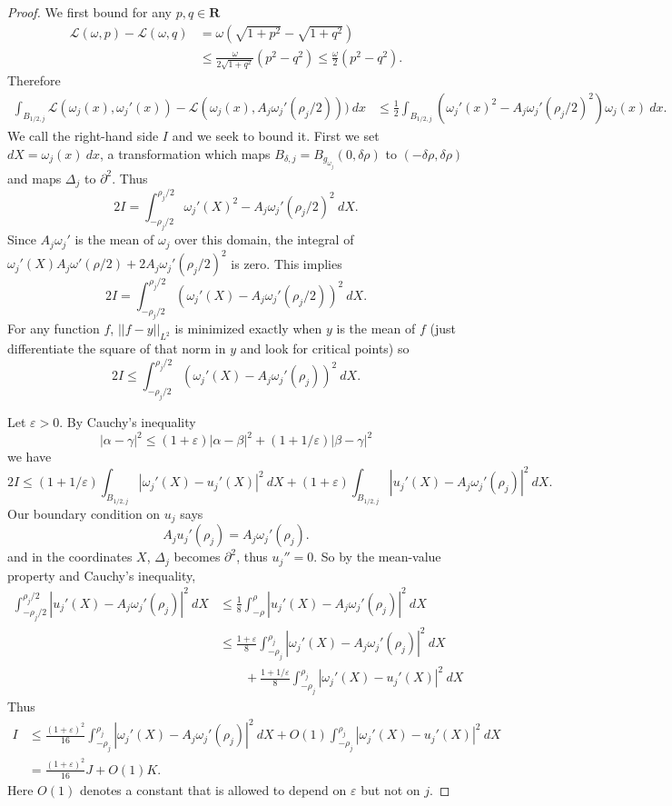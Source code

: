 \documentclass[reqno,12pt,letterpaper]{amsart}
\newcommand{\RR}{\mathbf{R}}
\theoremstyle{definition}
\numberwithin{equation}{section}
\begin{document}
\begin{proof}
We first bound for any $p, q \in \RR$
\begin{align*}
\mathscr L(\omega, p) - \mathscr L(\omega, q) &= \omega(\sqrt{1 + p^2} - \sqrt{1 + q^2}) \\
&\leq \frac{\omega}{2\sqrt{1 + q^2}}(p^2 - q^2) \leq \frac{\omega}{2}(p^2 - q^2).
\end{align*}
Therefore
\begin{align*}
\int_{B_{1/2,j}} \mathscr L(\omega_j(x), \omega_j'(x)) - \mathscr L(\omega_j(x),  A_j \omega_j'(\rho_j/2))) ~dx &\leq \frac{1}{2} \int_{B_{1/2,j}} (\omega_j'(x)^2 -  A_j \omega_j'(\rho_j/2)^2 ) \omega_j(x) ~dx.
\end{align*}
We call the right-hand side $I$ and we seek to bound it.
First we set $dX = \omega_j(x) ~dx$, a transformation which maps $B_{\delta,j} = B_{g_{\omega_j}}(0, \delta\rho)$ to $(-\delta\rho, \delta\rho)$ and maps $\Delta_j$ to $\partial^2$.
Thus
$$2I = \int_{-\rho_j/2}^{\rho_j/2} \omega_j'(X)^2 -  A_j \omega_j'(\rho_j/2)^2 ~dX.$$
Since $A_j \omega_j'$ is the mean of $\omega_j$ over this domain, the integral of $\omega_j'(X) A_j\omega'(\rho/2) + 2 A_j \omega_j'(\rho_j/2)^2$ is zero.
This implies
$$2I = \int_{-\rho_j/2}^{\rho_j/2} (\omega_j'(X) -  A_j \omega_j'(\rho_j/2))^2 ~dX.$$
For any function $f$, $||f - y||_{L^2}$ is minimized exactly when $y$ is the mean of $f$ (just differentiate the square of that norm in $y$ and look for critical points) so
$$2I \leq \int_{-\rho_j/2}^{\rho_j/2} (\omega_j'(X) -  A_j \omega_j'(\rho_j))^2 ~dX.$$

Let $\varepsilon > 0$.
By Cauchy's inequality
$$|\alpha - \gamma|^2 \leq (1 + \varepsilon) |\alpha - \beta|^2 + (1 + 1/\varepsilon) |\beta - \gamma|^2$$
we have
$$2I \leq (1 + 1/\varepsilon) \int_{B_{1/2,j}} |\omega_j'(X) - u_j'(X)|^2 ~dX + (1 + \varepsilon) \int_{B_{1/2,j}} |u_j'(X) -  A_j \omega_j'(\rho_j)|^2 ~dX.$$
Our boundary condition on $u_j$ says
$$A_j u_j'(\rho_j) = A_j\omega_j'(\rho_j).$$
and in the coordinates $X$, $\Delta_j$ becomes $\partial^2$, thus $u_j'' = 0$.
So by the mean-value property and Cauchy's inequality,
\begin{align*}
\int_{-\rho_j/2}^{\rho_j/2} |u_j'(X) -  A_j \omega_j'(\rho_j)|^2 ~dX &\leq \frac{1}{8} \int_{-\rho}^{\rho} |u_j'(X) -  A_j \omega_j'(\rho_j)|^2 ~dX\\
&\leq \frac{1 + \varepsilon}{8} \int_{-\rho_j}^{\rho_j} |\omega_j'(X) -  A_j \omega_j'(\rho_j)|^2 ~dX \\
&\qquad + \frac{1 + 1/\varepsilon}{8} \int_{-\rho_j}^{\rho_j} |\omega_j'(X) - u_j'(X)|^2 ~dX
\end{align*}
Thus
\begin{align*}
I &\leq \frac{(1 + \varepsilon)^2}{16} \int_{-\rho_j}^{\rho_j} |\omega_j'(X) -  A_j \omega_j'(\rho_j)|^2 ~dX + O(1) \int_{-\rho_j}^{\rho_j} |\omega_j'(X) - u_j'(X)|^2 ~dX\\
&= \frac{(1 + \varepsilon)^2}{16} J + O(1) K.
\end{align*}
Here $O(1)$ denotes a constant that is allowed to depend on $\varepsilon$ but not on $j$.


\end{proof}
\end{document}
